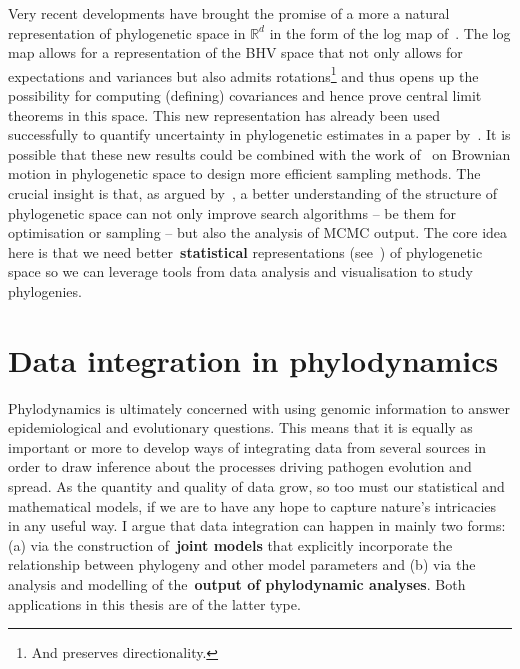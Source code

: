 Very recent developments have brought the promise of a more a natural representation of phylogenetic space in $\mathbb{R}^d$ in the form of the log map of~\cite{Barden2018}.
The log map allows for a representation of the BHV space that not only allows for expectations and variances but also admits rotations\footnote{And preserves directionality.} and thus opens up the possibility for computing (defining) covariances and hence prove central limit theorems in this space.
This new representation has already been used successfully to quantify uncertainty in phylogenetic estimates in a paper by~\cite{Willis2017}.
It is possible that these new results could be combined with the work of~\cite{Nye2015} on Brownian motion in phylogenetic space to design more efficient sampling methods.
The crucial insight is that, as argued by~\cite{StJohn2017}, a better understanding of the structure of phylogenetic space can not only improve search  algorithms -- be them for optimisation or sampling -- but also the analysis of MCMC output.
The core idea here is that we need better~\textbf{statistical} representations (see~\cite{Holland2013}) of phylogenetic space so we can leverage tools from data analysis and visualisation to study phylogenies.

\section{Data integration in phylodynamics}

Phylodynamics is ultimately concerned with using genomic information to answer epidemiological and evolutionary questions.
This means that it is equally as important or more to develop ways of integrating data from several sources in order to draw inference about the processes driving pathogen evolution and spread.
As the quantity and quality of data grow, so too must our statistical and mathematical models, if we are to have any hope to capture nature's intricacies in any useful way.
I argue that data integration can happen in mainly two forms: (a) via the construction of~\textbf{joint models} that explicitly incorporate the relationship between phylogeny and other model parameters and (b) via the analysis and modelling of the~\textbf{output of phylodynamic analyses}.
Both applications in this thesis are of the latter type.

